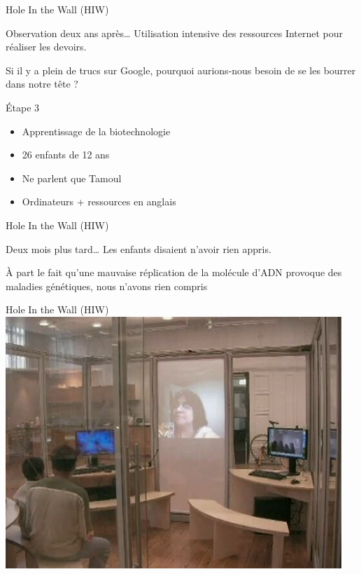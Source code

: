 \begin{frame}{Hole In the Wall (HIW)}
\begin{block}{Observation deux ans après\ldots}
  Utilisation intensive des ressources Internet pour réaliser les devoirs.
\end{block}
\pause
\begin{coolquote}
Si il y a plein de trucs sur Google, pourquoi aurions-nous besoin de se les bourrer dans notre tête ?
\end{coolquote}
\pause
  \begin{block}{Étape 3}
    \begin{itemize}
      \item Apprentissage de la biotechnologie
      \item 26 enfants de 12 ans
      \item Ne parlent que Tamoul
      \item Ordinateurs + ressources en anglais
    \end{itemize}
  \end{block}
\end{frame}

\begin{frame}{Hole In the Wall (HIW)}
  \begin{block}{Deux mois plus tard\ldots}
    Les enfants disaient n'avoir rien appris.
    \pause
    
    \begin{coolquote}
    À part le fait qu'une mauvaise réplication de la molécule d'ADN provoque des maladies génétiques, nous n'avons rien compris
    \end{coolquote}
  \end{block}
\end{frame}

\begin{frame}{Hole In the Wall (HIW)}
\includegraphics[width=.9\textwidth]{../resources/illustrations/soles.jpg}
\end{frame}

